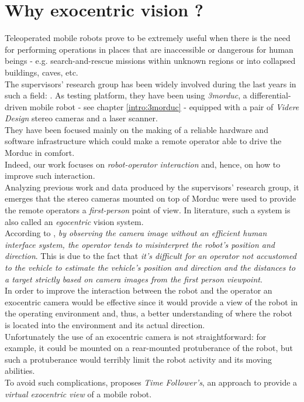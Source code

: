 \section{Why exocentric vision ?}
\label{exo:why_exocentric}

Teleoperated mobile robots prove to be extremely useful 
when there is the need for performing operations in places that 
are inaccessible or dangerous for human beings - e.g. 
search-and-rescue missions within unknown regions or into 
collapsed buildings, caves, etc.
\\
The supervisors' research group has been widely involved 
during the last years in such a field: \cite{livatino2010}.
As testing platform, they have been using \textit{3morduc},
a differential-driven mobile robot - see chapter \ref{intro:3morduc} -
equipped with a pair of \textit{Videre Design} \cite{videredesign} 
stereo cameras and a laser scanner.
\\
They have been focused 
mainly on the making of a reliable hardware and software 
infrastructure which could make a remote operator able to drive 
the Morduc in comfort.
\\
Indeed, our work focuses on \textit{robot-operator interaction} and, 
hence, on how to improve such interaction. 
\\
Analyzing previous work and data produced by the supervisors' 
research group, it emerges that the stereo cameras mounted on 
top of Morduc were used to provide the remote operators a 
\textit{first-person} point of view. In literature, such a 
system is also called an \textit{egocentric} vision system.
\\
According to \cite{sugimoto}, \textit{by observing the camera image 
without an efficient human interface system, the operator 
tends to misinterpret the robot's position and direction}. This is 
due to the fact that \textit{it's difficult for an
operator not accustomed to the vehicle to estimate the
vehicle's position and direction and the distances to a
target strictly based on camera images from the first person 
viewpoint}.
\\
In order to improve the interaction between the robot and the operator 
an exocentric camera would be effective since it would provide a 
view of the robot in the operating environment and, thus, 
a better understanding of where the robot is located into the
environment and its actual direction.
\\
Unfortunately the use of an exocentric camera is not straightforward: 
for example, it could be mounted on a rear-mounted protuberance of the 
robot, but such a protuberance would terribly limit the robot activity and 
its moving abilities.
\\
To avoid such complications, \cite{sugimoto} proposes 
\textit{Time Follower's}, an approach to provide a \textit{virtual exocentric 
view} of a mobile robot.


